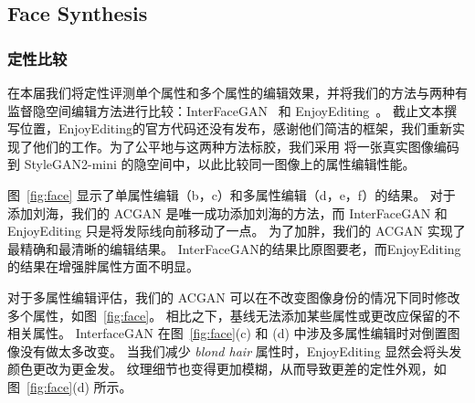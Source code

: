 \subsection{Face Synthesis}

\subsubsection{定性比较}
在本届我们将定性评测单个属性和多个属性的编辑效果，并将我们的方法与两种有监督隐空间编辑方法进行比较：InterFaceGAN~\cite{interfacegan} 和 EnjoyEditing~\cite{iclr2021}。 截止文本撰写位置，EnjoyEditing的官方代码还没有发布，感谢他们简洁的框架，我们重新实现了他们的工作。为了公平地与这两种方法标胶，我们采用 \cite{image2stylegan} 将一张真实图像编码到 StyleGAN2-mini 的隐空间中，以此比较同一图像上的属性编辑性能。

图~\ref{fig:face} 显示了单属性编辑（b，c）和多属性编辑（d，e，f）的结果。 对于添加刘海，我们的 ACGAN 是唯一成功添加刘海的方法，而 InterFaceGAN 和 EnjoyEditing 只是将发际线向前移动了一点。 为了加胖，我们的 ACGAN 实现了最精确和最清晰的编辑结果。 InterFaceGAN的结果比原图要老，而EnjoyEditing的结果在增强胖属性方面不明显。

对于多属性编辑评估，我们的 ACGAN 可以在不改变图像身份的情况下同时修改多个属性，如图~\ref{fig:face}。 相比之下，基线无法添加某些属性或更改应保留的不相关属性。 InterfaceGAN 在图~\ref{fig:face}(c) 和 (d) 中涉及多属性编辑时对倒置图像没有做太多改变。 当我们减少 \textit{blond hair} 属性时，EnjoyEditing 显然会将头发颜色更改为更金发。 纹理细节也变得更加模糊，从而导致更差的定性外观，如图~\ref{fig:face}(d) 所示。


